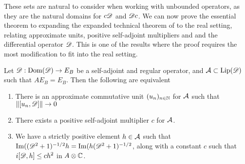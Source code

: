 These sets are natural to consider when working with unbounded operators, as they are the natural domains for $c\mathscr{D}$ and $\mathscr{D} c$.
We can now prove the essential theorem to expanding the expanded technical theorem of \cite{mesrennie} to the real setting, relating approximate units, positive self-adjoint multipliers and and the differential operator $\mathscr{D}$. This is one of the results where the proof requires the most modification to fit into the real setting. 
\begin{theorem}
	Let $\mathscr{D}:\operatorname{Dom}(\mathscr{D})\to E_B$ be a self-adjoint and regular operator, and $\mathcal{A}\subset \operatorname{Lip}(\mathscr{D})$ such that $AE_B=E_B$. Then the following are equivalent
	\begin{enumerate}
	\item
		There is an approximate commutative unit $(u_n)_{n\in \mathbb{N}}$ for $\mathcal{A}$ such that $\left \Vert [u_n,\mathscr{D}] \right \Vert\to 0$ 
	\item
		There exists a positive self-adjoint multiplier $c$ for $\mathcal{A}$. 
	\item
		We have a strictly positive element $h\in \mathcal{A}$ such that $\operatorname{Im}((\mathscr{D}^2+1)^{-1/2}h=\operatorname{Im}(h(\mathscr{D}^2+1)^{-1/2}$, along with a constant $c$ such that $i[\mathscr{D},h]\leq ch^2$ in $A\otimes \mathbb{C}$.
	\end{enumerate}
\end{theorem}
